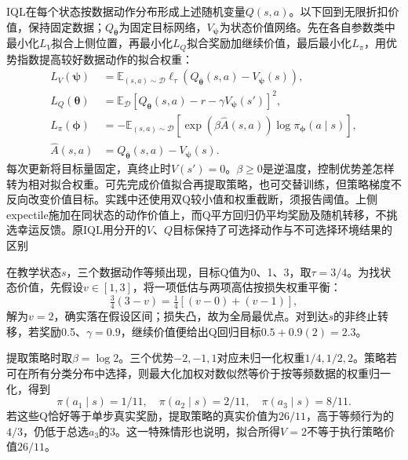 IQL在每个状态按数据动作分布形成上述随机变量$Q(s,a)$。以下回到无限折扣价值，保持固定数据；$Q_{\bar{\bm\theta}}$为固定目标网络，$V_{\bm\psi}$为状态价值网络。先在各自参数类中最小化$L_V$拟合上侧位置，再最小化$L_Q$拟合奖励加继续价值，最后最小化$L_\pi$，用优势指数提高较好数据动作的拟合权重：
\begin{align}
  \label{eq:rl-information-iql}
  L_V(\bm\psi)
    &=\mathbb E_{(s,a)\sim\mathcal D}
       \ell_\tau(Q_{\bar{\bm\theta}}(s,a)-V_{\bm\psi}(s)),\nonumber\\
  L_Q(\bm\theta)
    &=\mathbb E_{\mathcal D}
       [Q_{\bm\theta}(s,a)-r-\gamma V_{\bm\psi}(s')]^2,\nonumber\\
  L_\pi(\bm\phi)
    &=-\mathbb E_{(s,a)\sim\mathcal D}
       [\exp(\beta\widehat A(s,a))\log\pi_{\bm\phi}(a\mid s)],\\
  \widehat A(s,a)&=Q_{\bar{\bm\theta}}(s,a)-V_{\bm\psi}(s).
  \nonumber
\end{align}
每次更新将目标量固定，真终止时$V(s')=0$。$\beta\geq0$是逆温度，控制优势差怎样转为相对拟合权重。可先完成价值拟合再提取策略，也可交替训练，但策略梯度不反向改变价值目标。实践中还使用双Q较小值和权重截断，须报告阈值。上侧expectile施加在同状态的动作价值上，而Q平方回归仍平均奖励及随机转移，不挑选幸运反馈。原IQL用分开的$V$、$Q$目标保持了可选择动作与不可选择环境结果的区别

\begin{example}[三个动作的IQL更新与提取]
  \label{ex:rl-information-iql}
  在教学状态$s$，三个数据动作等频出现，目标Q值为0、1、3，取$\tau=3/4$。为找状态价值，先假设$v\in[1,3]$，将一项低估与两项高估按损失权重平衡：
  \[
    \tfrac34(3-v)=\tfrac14[(v-0)+(v-1)],
  \]
  解为$v=2$，确实落在假设区间；损失凸，故为全局最优点。对到达$s$的非终止转移，若奖励0.5、$\gamma=0.9$，继续价值便给出Q回归目标$0.5+0.9(2)=2.3$。

  提取策略时取$\beta=\log2$。三个优势$-2,-1,1$对应未归一化权重$1/4,1/2,2$。策略若可在所有分类分布中选择，则最大化加权对数似然等价于按等频数据的权重归一化，得到
  \[
    \pi(a_1\mid s)=1/11,\quad
    \pi(a_2\mid s)=2/11,\quad
    \pi(a_3\mid s)=8/11.
  \]
  若这些Q恰好等于单步真实奖励，提取策略的真实价值为$26/11$，高于等频行为的$4/3$，仍低于总选$a_3$的3。这一特殊情形也说明，拟合所得$V=2$不等于执行策略价值$26/11$。
\end{example}

